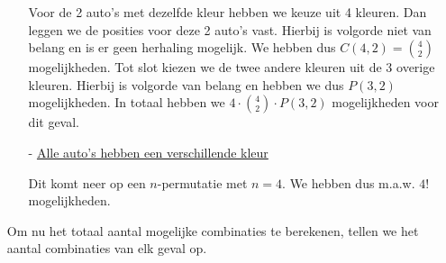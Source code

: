 \documentclass[kulak]{kulakarticle} %
\begin{document}
\begin{enumerate}
\begin{itemize}
			Voor de 2 auto's met dezelfde kleur hebben we keuze uit 4 kleuren. Dan leggen we de posities voor deze 2 auto's vast. Hierbij is volgorde niet van belang en is er geen herhaling mogelijk. We hebben dus \(C(4,2)={4 \choose 2}\) mogelijkheden. Tot slot kiezen we de twee andere kleuren uit de 3 overige kleuren. Hierbij is volgorde van belang en hebben we dus \(P(3,2)\) mogelijkheden. In totaal hebben we \(4 \cdot {4 \choose 2} \cdot P(3,2)\) mogelijkheden voor dit geval.

			\item[-] \underline{Alle auto's hebben een verschillende kleur}

			Dit komt neer op een \(n\)-permutatie met \(n=4\). We hebben dus m.a.w. \(4!\) mogelijkheden.

		\end{itemize}

		Om nu het totaal aantal mogelijke combinaties te berekenen, tellen we het aantal combinaties van elk geval op.
	\end{enumerate}
\end{document}
